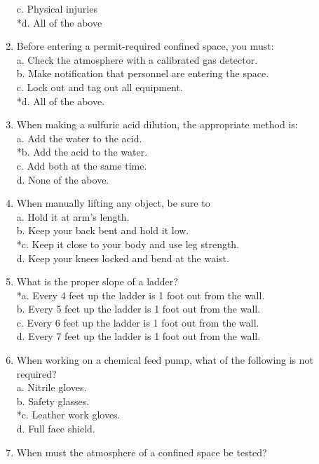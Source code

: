 \begin{enumerate}[1.]
c. Physical injuries\\
*d. All of the above\\
\item Before entering a permit-required confined space, you must:\\
a. Check the atmosphere with a calibrated gas detector.\\
b. Make notification that personnel are entering the space.\\
c. Lock out and tag out all equipment.\\
*d. All of the above.\\
\item When making a sulfuric acid dilution, the appropriate method is:\\
a. Add the water to the acid.\\
*b. Add the acid to the water.\\
c. Add both at the same time.\\
d. None of the above.\\
\item When manually lifting any object, be sure to\\
a. Hold it at arm's length.\\
b. Keep your back bent and hold it low.\\
*c. Keep it close to your body and use leg strength.\\
d. Keep your knees locked and bend at the waist.\\
\item What is the proper slope of a ladder?\\
*a. Every 4 feet up the ladder is 1 foot out from the wall.\\
b. Every 5 feet up the ladder is 1 foot out from the wall.\\
c. Every 6 feet up the ladder is 1 foot out from the wall.\\
d. Every 7 feet up the ladder is 1 foot out from the wall.\\
\item When working on a chemical feed pump, what of the following is not required?\\
a. Nitrile gloves.\\
b. Safety glasses.\\
*c. Leather work gloves.\\
d. Full face shield.\\
\item When must the atmosphere of a confined space be tested?\\

\end{enumerate}
